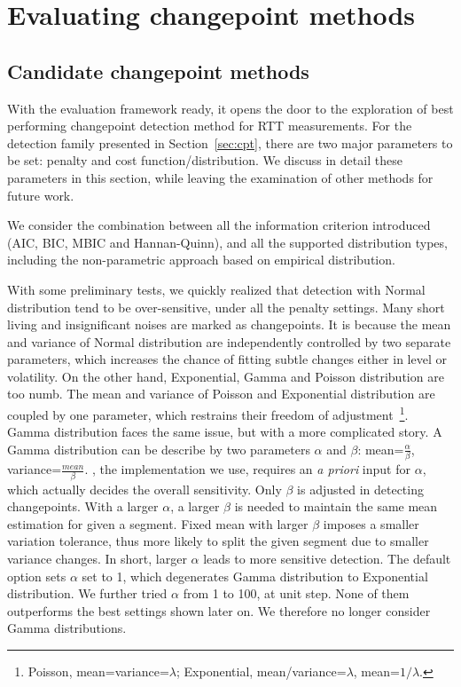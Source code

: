 \section{Evaluating changepoint methods}
\subsection{Candidate changepoint methods}
\label{sec:method}
With the evaluation framework ready, it opens the door to the exploration of best performing changepoint detection method for RTT measurements.
For the detection family presented in Section~\ref{sec:cpt}, there are two major parameters to be set: penalty and cost function/distribution.
We discuss in detail these parameters in this section, while leaving the examination of other methods for future work.

We consider the combination between all the information criterion introduced (AIC, BIC, MBIC and Hannan-Quinn), and all the supported distribution types, including the non-parametric approach based on empirical distribution.

With some preliminary tests, we quickly realized that detection with Normal distribution tend to be over-sensitive, under all the penalty settings.
Many short living and insignificant noises are marked as changepoints.
It is because the mean and variance of Normal distribution are independently controlled by two separate parameters, which increases the chance of fitting subtle changes either in level or volatility.
On the other hand, Exponential, Gamma and Poisson distribution are too numb.
The mean and variance of Poisson and Exponential distribution are coupled by one parameter,
which restrains their freedom of adjustment~\footnote{Poisson, mean=variance=$\lambda$; Exponential, mean/variance=$\lambda$, mean=$1/\lambda$.}.
Gamma distribution faces the same issue, but with a more complicated story.
A Gamma distribution can be describe by two parameters $\alpha$ and $\beta$: mean=$\frac{\alpha}{\beta}$, variance=$\frac{mean}{\beta}$.
\cite{Killick2013a}, the implementation we use, requires an \textit{a priori} input for $\alpha$, which actually decides the overall sensitivity. 
Only $\beta$ is adjusted in detecting changepoints.
With a larger $\alpha$, a larger $\beta$ is needed to maintain the same mean estimation for given a segment.
Fixed mean with larger $\beta$ imposes a smaller variation tolerance, thus more likely to split the given segment due to smaller variance changes.
In short, larger $\alpha$ leads to more sensitive detection.
The default option sets $\alpha$ set to 1, which degenerates Gamma distribution to Exponential distribution. 
We further tried $\alpha$ from 1 to 100, at unit step. 
None of them outperforms the best settings shown later on. 
We therefore no longer consider Gamma distributions.

